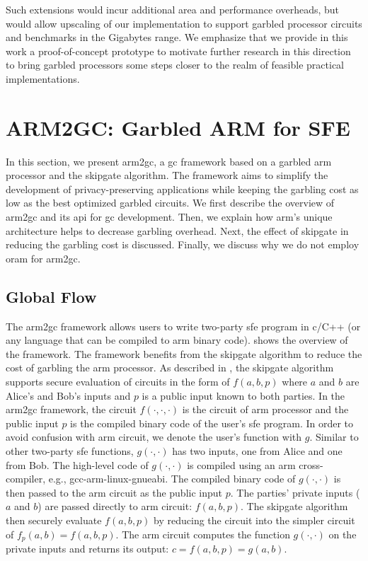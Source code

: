 Such extensions would incur additional area and performance overheads, but would allow upscaling of our implementation to support garbled processor circuits and benchmarks in the Gigabytes range.
We emphasize that we provide in this work a proof-of-concept prototype to motivate further research in this direction to bring garbled processors some steps closer to the realm of feasible practical implementations.

\section{ARM2GC: Garbled ARM for SFE}\label{sec:processor-arm}
In this section, we present \gls{arm2gc}, a \acrshort{gc} framework based on a garbled \gls{arm} processor and the \gls{skipgate} algorithm.
The framework aims to simplify the development of privacy-preserving applications while keeping the garbling cost as low as the best optimized garbled circuits.
We first describe the overview of \gls{arm2gc} and its \acrshort{api} for \acrshort{gc} development.
Then, we explain how \gls{arm}'s unique architecture helps to decrease garbling overhead.
Next, the effect of \gls{skipgate} in reducing the garbling cost is discussed.
Finally, we discuss why we do not employ \acrshort{oram} for \gls{arm2gc}.

\subsection{Global Flow}\label{ssec:arm-global}
The \gls{arm2gc} framework allows users to write two-party \acrshort{sfe} program in \gls{c}/C++ (or any language that can be compiled to \gls{arm} binary code).
 shows the overview of the framework.
The framework benefits from the \gls{skipgate} algorithm to reduce the cost of garbling the \gls{arm} processor.
As described in , the \gls{skipgate} algorithm supports secure evaluation of circuits in the form of $f(a,b,p)$ where $a$ and $b$ are Alice's and Bob's inputs and $p$ is a public input known to both parties.
In the \gls{arm2gc} framework, the circuit $f(\cdot,\cdot,\cdot)$ is the circuit of \gls{arm} processor and the public input $p$ is the compiled binary code of the user's \acrshort{sfe} program.
In order to avoid confusion with \gls{arm} circuit, we denote the user's function with $g$.
Similar to other two-party \acrshort{sfe} functions, $g(\cdot,\cdot)$ has two inputs, one from Alice and one from Bob.
The high-level code of $g(\cdot,\cdot)$ is compiled using an \gls{arm} cross-compiler, e.g., gcc-arm-linux-gnueabi.
The compiled binary code of $g(\cdot,\cdot)$ is then passed to the \gls{arm} circuit as the public input $p$.
The parties' private inputs ($a$ and $b$) are passed directly to \gls{arm} circuit: $f(a,b,p)$.
The \gls{skipgate} algorithm then securely evaluate $f(a,b,p)$ by reducing the circuit into the simpler circuit of $f_{p}(a,b) = f(a,b,p)$.
The \gls{arm} circuit computes the function $g(\cdot,\cdot)$ on the private inputs and returns its output: $c = f(a,b,p) = g(a,b)$.

